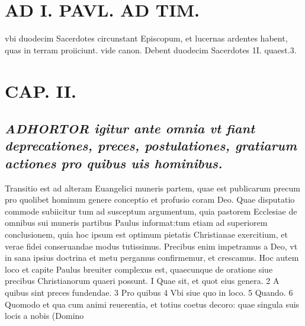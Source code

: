 \documentclass{article}
\begin{document}
\begin{pages}
\section*{AD I. PAVL. AD TIM. }
\marginpar{[ p.38 ]}\pstart vbi duodecim Sacerdotes circunstant Episcopum, et lucernas ardentes habent, quas in terram proiiciunt. vide canon. Debent duodecim Sacerdotes 1I. quaest.3.  \pend
\endnumbering\beginnumbering\section{CAP. II.}
{}
\subsection*{\textit{\huge\textbf{A}\normalsize DHORTOR igitur ante omnia vt fiant deprecationes, preces, postulationes, gratiarum actiones pro quibus uis hominibus. }}\pstart Transitio est ad alteram Euangelici muneris partem, quae est publicarum precum pro quolibet hominum genere conceptio et profusio coram Deo. Quae disputatio commode subiicitur tum ad susceptum argumentum, quia pastorem Ecclesiae de omnibus sui muneris partibus Paulus informat:tum etiam ad superiorem conclusionem, quia hoc ipsum est optimum pietatis Christianae exercitium, et verae fidei conseruandae modus tutissimus. Precibus enim impetramus a Deo, vt in sana ipsius doctrina et metu pergamus confirmemur, et crescamus. Hoc autem loco et capite Paulus breuiter complexus est, quaecunque de oratione siue precibus Christianorum quaeri possunt. I Quae sit, et quot eius genera. 2 A quibus sint preces fundendae. 3 Pro quibus 4 Vbi siue quo in loco. 5 Quando. 6 Quomodo et qua cum animi reuerentia, et totius coetus decoro: quae singula suis locis a nobis (Domino  \pend

\end{pages}
\end{document}
